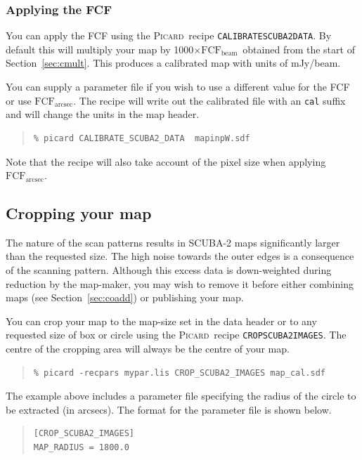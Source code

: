 \documentclass[twoside,11pt]{article}
\newcommand{\htmlref}[2]{#1}
\newcommand{\latexhtml}[2]{#1}
\newcommand{\xref}[3]{#1}
\newcommand{\xlabel}[1]{}
\renewcommand{\_}{\texttt{\symbol{95}}}
\newenvironment{myquote}{
   \color{MidnightBlue}\begin{quote}\begin{small}}{
   \end{small}\end{quote}
}
\newcommand{\fcfb}{$\mathrm{FCF_{beam}}$}
\newcommand{\fcfa}{$\mathrm{FCF_{arcsec}}$}
\newcommand{\picard}{\xref{\textsc{Picard}}{sun265}{}}
\newcommand{\drrecipe}[1]{\texttt{#1}}
\newcommand{\file}[1]{\texttt{#1}}
\newcommand{\cref}[3]{\latexhtml{#1~\ref{#2}}{\htmlref{#3}{#2}}}
\renewenvironment{myquote}{
      \begin{quote}\begin{small}}{
      \end{small}\end{quote}
   }
\begin{document}
\subsubsection{Applying the FCF}

You can apply the FCF using the \picard\ recipe
\xref{\drrecipe{CALIBRATE\_SCUBA2\_DATA}}{sun265}{CALIBRATE\_SCUBA2\_DATA}.
By default this will multiply your map by
1000$\times$\fcfb\ obtained from the start of
\cref{Section}{sec:cmult}{Flux conversion factors}. This produces a
calibrated map with units of mJy/beam.

You can supply a parameter file if you wish to use a different value
for the FCF or use \fcfa. The recipe will write out the calibrated
file with an \file{\_cal} suffix and will change the units in the
map header.

\begin{myquote}
\begin{verbatim}
% picard CALIBRATE_SCUBA2_DATA  mapinpW.sdf
\end{verbatim}
\end{myquote}
Note that the recipe will also take account of the pixel size when
applying \fcfa.


\subsection{\xlabel{crop}Cropping your map}
\label{sec:crop}

The nature of the scan patterns results in SCUBA-2 maps significantly
larger than the requested size. The high noise towards the outer edges
is a consequence of the scanning pattern. Although this excess data is
down-weighted during reduction by the map-maker, you may wish to remove
it before either combining maps (see
\cref{Section}{sec:coadd}{Co-adding multiple maps}) or publishing your
map.

You can crop your map to the map-size set in the data header or
to any requested size of box or circle using the \picard\ recipe
\xref{\drrecipe{CROP\_SCUBA2\_IMAGES}}{sun265}{CROP\_SCUBA2\_IMAGES}.
The centre of the cropping area will always be the centre of your map.
\begin{myquote}
\begin{verbatim}
% picard -recpars mypar.lis CROP_SCUBA2_IMAGES map_cal.sdf
\end{verbatim}
\end{myquote}
The example above includes a parameter file specifying the radius of
the circle to be extracted (in arcsecs).  The format for the parameter
file is shown below.
\begin{center}
\begin{quote}
\begin{verbatim}
[CROP_SCUBA2_IMAGES]
MAP_RADIUS = 1800.0
\end{verbatim}
\end{quote}
\end{center}
\end{document}
